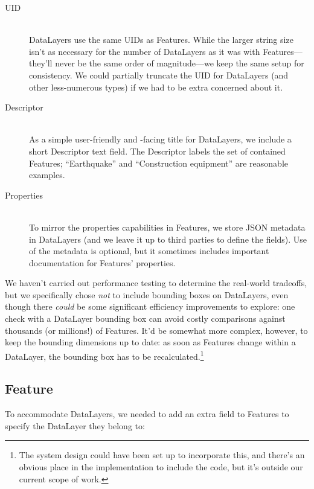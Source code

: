 \begin{description}

\item[UID] \hfill \\
DataLayers use the same UIDs as Features. While the larger string size isn't as necessary for the number of DataLayers as it was with Features---they'll never be the same order of magnitude---we keep the same setup for consistency. We could partially truncate the UID for DataLayers (and other less-numerous types) if we had to be extra concerned about it.

\item[Descriptor] \hfill \\
As a simple user-friendly and -facing title for DataLayers, we include a short Descriptor text field. The Descriptor labels the set of contained Features; ``Earthquake'' and ``Construction equipment'' are reasonable examples.

\item[Properties] \hfill \\
To mirror the properties capabilities in Features, we store JSON metadata in DataLayers (and we leave it up to third parties to define the fields). Use of the metadata is optional, but it sometimes includes important documentation for Features' properties.
  
\end{description}

 We haven't carried out performance testing to determine the real-world tradeoffs, but we specifically chose \textit{not} to include bounding boxes on DataLayers, even though there \textit{could} be some significant efficiency improvements to explore: one check with a DataLayer bounding box can avoid costly comparisons against thousands (or millions!) of Features. It'd be somewhat more complex, however, to keep the bounding dimensions up to date: as soon as Features change within a DataLayer, the bounding box has to be recalculated.\footnote{The system design could have been set up to incorporate this, and there's an obvious place in the implementation to include the code, but it's outside our current scope of work.}

\subsection{Feature}
To accommodate DataLayers, we needed to add an extra field to Features to specify the DataLayer they belong to:


